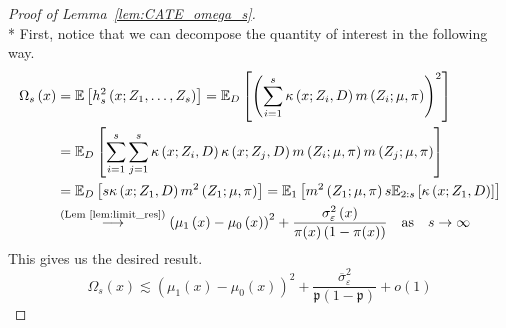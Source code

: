 \begin{proof}[Proof of Lemma~\ref{lem:CATE_omega_s}]\mbox{}\\*
    First, notice that we can decompose the quantity of interest in the following way.
	\begin{equation}
		\begin{aligned}
			\Omega_{s}\left(x\right)
			 & = \mathbb{E}\left[h_{s}^{2}\left(x; Z_1, \ldots,  Z_{s}\right)\right]
             = \mathbb{E}_{D}\left[\left(\sum_{i = 1}^{s} \kappa\left(x; Z_{i}, D\right) m\left(Z_{i}; \mu, \pi\right)\right)^2\right]\\
             & = \mathbb{E}_{D}\left[\sum_{i = 1}^{s}\sum_{j = 1}^{s}\kappa\left(x; Z_{i}, D\right)\kappa\left(x; Z_{j}, D\right)
             m\left(Z_{i}; \mu, \pi\right)m\left(Z_{j}; \mu, \pi\right)\right] \\
             & = \mathbb{E}_{D}\left[s \kappa\left(x; Z_1, D\right)  m^2\left(Z_{1}; \mu, \pi\right)\right]
             = \mathbb{E}_{1}\left[ m^2\left(Z_{1}; \mu, \pi\right) s \mathbb{E}_{2:s}\left[\kappa\left(x; Z_1, D\right)\right]\right]\\
             & \overset{\text{(Lem~\ref{lem:limit_res})}}{\longrightarrow}
			 \left(\mu_{1}\left(x\right) - \mu_{0}\left(x\right)\right)^2 + \frac{\sigma_{\varepsilon}^2\left(x\right)}{\pi(x)\left(1 - \pi(x)\right)}
            \quad \text{as} \quad
            s \rightarrow \infty
		\end{aligned}
	\end{equation}
    This gives us the desired result.
    \begin{equation}
        \Omega_{s}\left(x\right)
        \lesssim \left(\mu_{1}\left(x\right) - \mu_{0}\left(x\right)\right)^2 + \frac{\overline{\sigma}^2_{\varepsilon}}{\mathfrak{p}\left(1 - \mathfrak{p}\right)} + o(1)
    \end{equation}
\end{proof}

